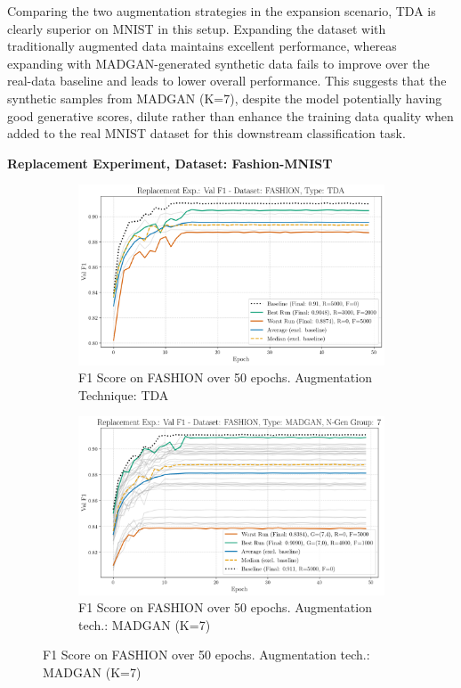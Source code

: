 Comparing the two augmentation strategies in the expansion scenario, TDA is clearly superior on MNIST in this setup. Expanding the dataset with traditionally augmented data maintains excellent performance, whereas expanding with MADGAN-generated synthetic data fails to improve over the real-data baseline and leads to lower overall performance. This suggests that the synthetic samples from MADGAN (K=7), despite the model potentially having good generative scores, dilute rather than enhance the training data quality when added to the real MNIST dataset for this downstream classification task.


\newpage
\noindent\textbf{Replacement Experiment, Dataset: Fashion-MNIST}
\begin{figure}[H]
	\centering
	\begin{subfigure}{.85\textwidth}
		\includegraphics[width=\textwidth]{abb/strat_classifier_performance/tda_fashion_mnist/replacement_experiments/val_f1_score_tda_fashion_mnist_fashion_all.png}
		\caption{F1 Score on FASHION over 50 epochs. Augmentation Technique: TDA} 
        \label{fig:res_replacement_fashion_tda_vs_madgan__tda}
	\end{subfigure}
	\begin{subfigure}{.85\textwidth}
		\includegraphics[width=\textwidth]{abb/strat_classifier_performance/FASHION_STRATIFIED_CLASSIFIERS_MADGAN_NEW/replacement_experiments/val_f1_score_MADGAN_FASHION_n_gen_7_all.png}
		\caption{F1 Score on FASHION over 50 epochs. Augmentation tech.: MADGAN (K=7)} 
        \label{fig:res_replacement_fashion_tda_vs_madgan__madgan}
	\end{subfigure}
\end{figure}

